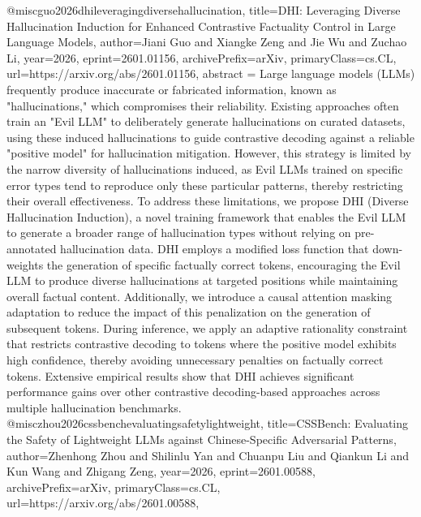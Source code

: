 {}@misc{guo2026dhileveragingdiversehallucination,
      title={DHI: Leveraging Diverse Hallucination Induction for Enhanced Contrastive Factuality Control in Large Language Models}, 
      author={Jiani Guo and Xiangke Zeng and Jie Wu and Zuchao Li},
      year={2026},
      eprint={2601.01156},
      archivePrefix={arXiv},
      primaryClass={cs.CL},
      url={https://arxiv.org/abs/2601.01156},
      abstract = {Large language models (LLMs) frequently produce inaccurate or fabricated information, known as "hallucinations," which compromises their reliability. Existing approaches often train an "Evil LLM" to deliberately generate hallucinations on curated datasets, using these induced hallucinations to guide contrastive decoding against a reliable "positive model" for hallucination mitigation. However, this strategy is limited by the narrow diversity of hallucinations induced, as Evil LLMs trained on specific error types tend to reproduce only these particular patterns, thereby restricting their overall effectiveness. To address these limitations, we propose DHI (Diverse Hallucination Induction), a novel training framework that enables the Evil LLM to generate a broader range of hallucination types without relying on pre-annotated hallucination data. DHI employs a modified loss function that down-weights the generation of specific factually correct tokens, encouraging the Evil LLM to produce diverse hallucinations at targeted positions while maintaining overall factual content. Additionally, we introduce a causal attention masking adaptation to reduce the impact of this penalization on the generation of subsequent tokens. During inference, we apply an adaptive rationality constraint that restricts contrastive decoding to tokens where the positive model exhibits high confidence, thereby avoiding unnecessary penalties on factually correct tokens. Extensive empirical results show that DHI achieves significant performance gains over other contrastive decoding-based approaches across multiple hallucination benchmarks.}
}@misc{zhou2026cssbenchevaluatingsafetylightweight,
      title={CSSBench: Evaluating the Safety of Lightweight LLMs against Chinese-Specific Adversarial Patterns}, 
      author={Zhenhong Zhou and Shilinlu Yan and Chuanpu Liu and Qiankun Li and Kun Wang and Zhigang Zeng},
      year={2026},
      eprint={2601.00588},
      archivePrefix={arXiv},
      primaryClass={cs.CL},
      url={https://arxiv.org/abs/2601.00588},
}
